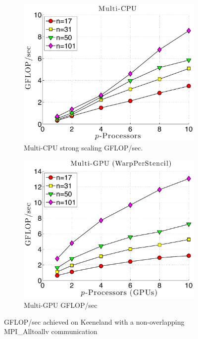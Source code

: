 \begin{figure} 
\centering
\begin{subfigure}[t]{0.425\textwidth}
\centering
\includegraphics[width=1.0\textwidth]{../figures/keeneland_results/alltoallv_cosine/gflops_1CPU_vs_NCPU.pdf}
\caption{Multi-CPU strong scaling GFLOP/sec.}
\end{subfigure} 
\begin{subfigure}[t]{0.425\textwidth}
\centering
\includegraphics[width=1.0\textwidth]{../figures/keeneland_results/alltoallv_cosine/gflops_1GPU_vs_NGPU_WarpPerStencil.pdf}
\caption{Multi-GPU GFLOP/sec}
\end{subfigure} 
\caption{GFLOP/sec achieved on Keeneland with a non-overlapping MPI\_Alltoallv communication}
\label{fig:alltoall_gflops}
\end{figure}

